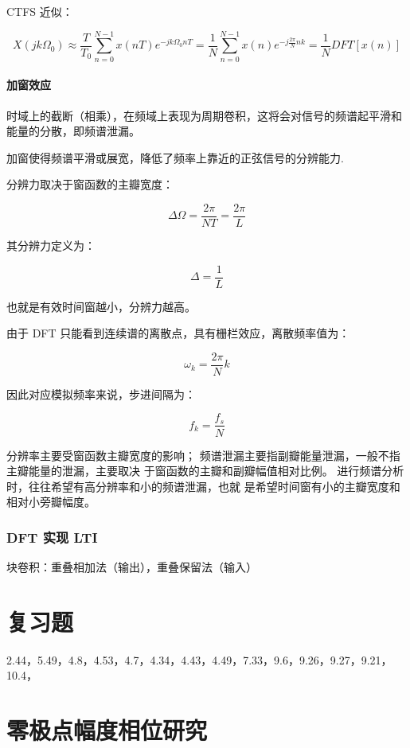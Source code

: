 \documentclass[cn,11pt,chinese,black,simple]{elegantbook}
\begin{document}
CTFS 近似：

\[
X\left(j k \Omega_{0}\right) \approx \frac{T}{T_{0}} \sum_{n=0}^{N-1} x(n T) e^{-j k \Omega_{0} n T}=\frac{1}{N} \sum_{n=0}^{N-1} x(n) e^{-j \frac{2 \pi}{N} n k}=\frac{1}{N} D F T[x(n)]
\]

\subsubsection{加窗效应}

时域上的截断（相乘），在频域上表现为周期卷积，这将会对信号的频谱起平滑和能量的分散，即频谱泄漏。

加窗使得频谱平滑或展宽，降低了频率上靠近的正弦信号的分辨能力.

分辨力取决于窗函数的主瓣宽度：

\[\Delta\Omega = \frac{2\pi}{NT} = \frac{2\pi}{L}\]

其分辨力定义为：

\[\Delta = \frac{1}{L}\]

也就是有效时间窗越小，分辨力越高。

由于 DFT 只能看到连续谱的离散点，具有栅栏效应，离散频率值为：

\[\omega_k = \frac{2\pi}{N} k\]

因此对应模拟频率来说，步进间隔为：

\[f_k = \frac{f_s}{N}\]

分辨率主要受窗函数主瓣宽度的影响；
频谱泄漏主要指副瓣能量泄漏，一般不指主瓣能量的泄漏，主要取决
于窗函数的主瓣和副瓣幅值相对比例。
进行频谱分析时，往往希望有高分辨率和小的频谱泄漏，也就
是希望时间窗有小的主瓣宽度和相对小旁瓣幅度。


\subsection{DFT 实现 LTI}

块卷积：重叠相加法（输出），重叠保留法（输入）


\chapter{复习题}

2.44，5.49，4.8，4.53，4.7，4.34，4.43，4.49，7.33，9.6，9.26，9.27，9.21，10.4，


\appendix

\chapter{零极点幅度相位研究}




\let\chapname\undefined
\ifx\mainclass\undefined
\end{document}
